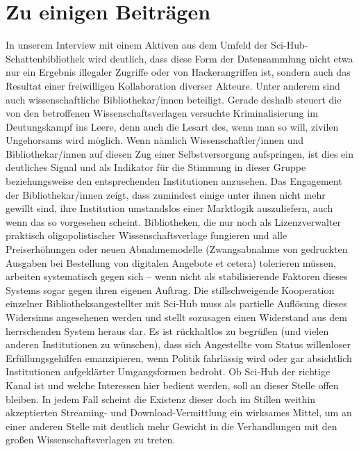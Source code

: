 \documentclass[a4paper,
fontsize=11pt,
oneside,
numbers=noperiodatend,
parskip=half-,
bibliography=totoc,
final
]{scrartcl}
\begin{document}
\hypertarget{zu-einigen-beitruxe4gen}{%
\section*{Zu einigen Beiträgen}\label{zu-einigen-beitruxe4gen}}

In unserem Interview mit einem Aktiven aus dem Umfeld der
Sci-Hub-Schattenbibliothek wird deutlich, dass diese Form der
Datensammlung nicht etwa nur ein Ergebnis illegaler Zugriffe oder von
Hackerangriffen ist, sondern auch das Resultat einer freiwilligen
Kollaboration diverser Akteure. Unter anderem sind auch
wissenschaftliche Bibliothekar/innen beteiligt. Gerade deshalb steuert
die von den betroffenen Wissenschaftsverlagen versuchte Kriminalisierung
im Deutungskampf ins Leere, denn auch die Lesart des, wenn man so will,
zivilen Ungehorsams wird möglich. Wenn nämlich Wissenschaftler/innen und
Bibliothekar/innen auf diesen Zug einer Selbstversorgung aufspringen,
ist dies ein deutliches Signal und als Indikator für die Stimmung in
dieser Gruppe beziehungsweise den entsprechenden Institutionen
anzusehen. Das Engagement der Bibliothekar/innen zeigt, dass zumindest
einige unter ihnen nicht mehr gewillt sind, ihre Institution umstandslos
einer Marktlogik auszuliefern, auch wenn das so vorgesehen scheint.
Bibliotheken, die nur noch als Lizenzverwalter praktisch
oligopolistischer Wissenschaftsverlage fungieren und alle
Preiserhöhungen oder neuen Abnahmemodelle (Zwangsabnahme von gedruckten
Ausgaben bei Bestellung von digitalen Angebote et cetera) tolerieren
müssen, arbeiten systematisch gegen sich -- wenn nicht als
stabilisierende Faktoren dieses Systems sogar gegen ihren eigenen
Auftrag. Die stillschweigende Kooperation einzelner
Bibliotheksangestellter mit Sci-Hub muss als partielle Auflösung dieses
Widersinns angesehenen werden und stellt sozusagen einen Widerstand aus
dem herrschenden System heraus dar. Es ist rückhaltlos zu begrüßen (und
vielen anderen Institutionen zu wünschen), dass sich Angestellte vom
Status willenloser Erfüllungsgehilfen emanzipieren, wenn Politik
fahrlässig wird oder gar absichtlich Institutionen aufgeklärter
Umgangsformen bedroht. Ob Sci-Hub der richtige Kanal ist und welche
Interessen hier bedient werden, soll an dieser Stelle offen bleiben. In
jedem Fall scheint die Existenz dieser doch im Stillen weithin
akzeptierten Streaming- und Download-Vermittlung ein wirksames Mittel,
um an einer anderen Stelle mit deutlich mehr Gewicht in die
Verhandlungen mit den großen Wissenschaftsverlagen zu treten.
\end{document}
